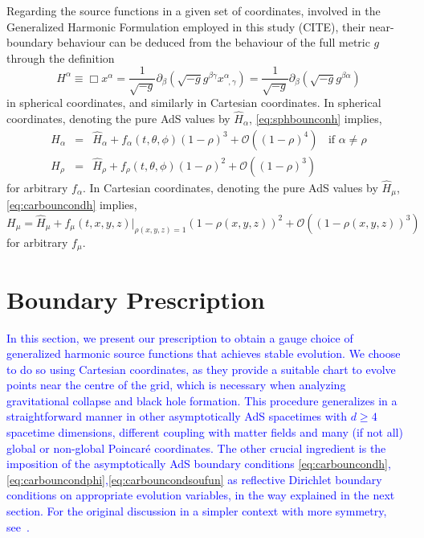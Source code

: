 \documentclass[a4paper,11pt]{article}
\numberwithin{equation}{section}
\begin{document}
Regarding the source functions in a given set of coordinates, involved in the Generalized Harmonic Formulation employed in this study (CITE), their near-boundary behaviour can be deduced from the behaviour of the full metric $g$ through the definition 
\begin{equation}\label{eq:defsoufunsph}
H^\alpha \equiv \Box x^\alpha = \frac{1}{\sqrt{-g}}\partial_\beta (\sqrt{-g}g^{\beta\gamma}x^\alpha_{\;\;,\gamma})=\frac{1}{\sqrt{-g}}\partial_\beta (\sqrt{-g}g^{\beta\alpha})
\end{equation}
in spherical coordinates, and similarly in Cartesian coordinates. 
In spherical coordinates, denoting the pure AdS values by $\hat{H}_\alpha$, \eqref{eq:sphbounconh} implies,
\begin{eqnarray}\label{eq:sphbouncondsoufunc}
H_\alpha&=&\hat{H}_\alpha+f_\alpha(t,\theta,\phi)(1-\rho)^3+\mathcal{O}((1-\rho)^4) \;\; \textrm{ if $\alpha\neq\rho$} \\ \nonumber
H_\rho&=&\hat{H}_\rho+f_\rho(t,\theta,\phi)(1-\rho)^2+\mathcal{O}((1-\rho)^3)
\end{eqnarray}
for arbitrary $f_\alpha$.
In Cartesian coordinates,  denoting the pure AdS values by $\hat{H}_\mu$, \eqref{eq:carbouncondh} implies,
\begin{equation}\label{eq:carbouncondsoufun}
H_\mu=\hat{H}_\mu+f_\mu(t,x,y,z)|_{\rho(x,y,z)=1}(1-\rho(x,y,z))^2+\mathcal{O}((1-\rho(x,y,z))^3)
\end{equation}
for arbitrary $f_\mu$.
\fi


\section{Boundary Prescription}\label{sec:pre_sta}

\textcolor{blue}{In this section, we present our prescription to obtain a gauge choice of generalized harmonic source functions that achieves stable evolution.
We choose to do so using Cartesian coordinates, as they provide a suitable chart to evolve points near the centre of the grid, which is necessary when analyzing gravitational collapse and black hole formation. This procedure generalizes in a straightforward manner in other asymptotically AdS spacetimes with $d\geq 4$ spacetime dimensions, different coupling with matter fields and many (if not all) global or non-global Poincar\'{e} coordinates.
The other crucial ingredient is the imposition of the asymptotically AdS boundary conditions \eqref{eq:carbouncondh},\eqref{eq:carbouncondphi},\eqref{eq:carbouncondsoufun} as reflective Dirichlet boundary conditions on appropriate evolution variables, in the way explained in the next section.
For the original discussion in a simpler context with more symmetry, see~\cite{Bantilan:2012vu}. }
\end{document}
